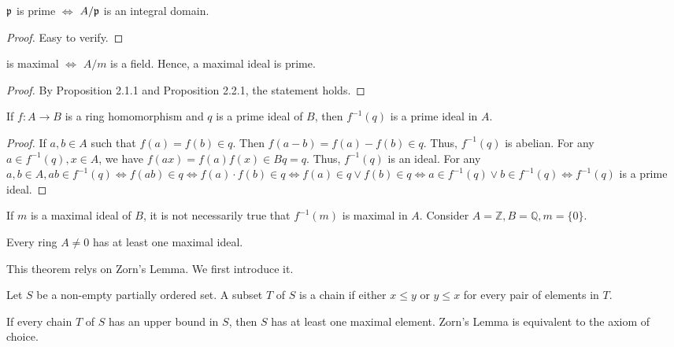 \documentclass[11pt,fleqn]{book} %
\begin{document}
\begin{CJK}{UTF8}{gkai}
\begin{proposition}
	$\mathfrak{p}$ is prime $\iff$ $A/\mathfrak{p}$ is an integral domain.
\end{proposition}
\begin{proof}
	Easy to verify.
\end{proof}

\begin{proposition}
	\fm \text{ }is maximal $\iff$ $A/m$ is a field. Hence, a maximal ideal is prime.
\end{proposition}
\begin{proof}
	By Proposition 2.1.1 and Proposition 2.2.1, the statement holds.
\end{proof}

\begin{proposition}
	If $f: A\to B$ is a ring homomorphism and $q$ is a prime ideal of $B$, then $f^{-1}(q)$ is a prime ideal in $A$.
\end{proposition}
\begin{proof}
	If $a, b \in A$ such that $f(a) = f(b) \in q$. Then $f(a-b) = f(a)-f(b) \in q$. Thus, $f^{-1}(q)$ is abelian. For any $a \in f^{-1}(q), x \in A$, we have 
	$f(ax) = f(a)f(x) \in Bq = q$. Thus, $f^{-1}(q)$ is an ideal. For any $a, b\in A, ab \in f^{-1}(q) \iff f(ab) \in q \iff f(a)\cdot f(b)\in q \iff f(a) \in q \vee f(b) \in q \iff a \in f^{-1}(q) \vee b \in f^{-1}(q) \iff f^{-1}(q)$ is a prime ideal.  	
\end{proof}

\begin{remark}
	If $m$ is a maximal ideal of $B$, it is not necessarily true that $f^{-1}(m)$ is maximal in $A$. Consider $A = \mathbb{Z}, B = \mathbb{Q}, m = \{0\}$.
\end{remark}

\begin{theorem}
	Every ring $A \neq 0$ has at least one maximal ideal.
\end{theorem}
This theorem relys on Zorn's Lemma. We first introduce it.

\begin{definition}
	 Let $S$ be a non-empty partially ordered set. A subset $T$ of $S$ is a chain if either $x \leq y$ or $y \leq x$ for every pair of elements in $T$.
\end{definition}

\begin{lemma}
	[Zorn] If every chain $T$ of $S$ has an upper bound in $S$, then $S$ has at least one maximal element. Zorn's Lemma is equivalent to the axiom of choice.
\end{lemma}


\end{CJK}
\end{document}
